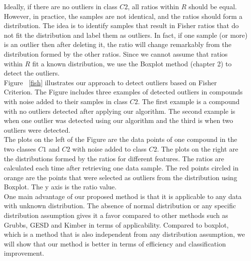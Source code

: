Ideally, if there are no outliers in class $C2$, all ratios within $R$ should be equal. However, in practice, the samples are not identical, and the ratios should form a distribution. The idea is to identify samples that result in Fisher ratios that do not fit the distribution and label them as outliers. In fact, if one sample (or more) is an outlier then after deleting it, the ratio will change remarkably from the distribution formed by the other ratios. Since we cannot assume that ratios within $R$ fit a known distribution, we use the Boxplot method (chapter 2) to detect the outliers.\\
Figure ~\ref{fish} illustrates our approach to detect outliers based on Fisher Criterion. The Figure includes three examples of detected outliers in compounds with noise added to their samples in class $C2$. The first example is a compound with no outliers detected after applying our algorithm. The second example is when one outlier was detected using our algorithm and the third is when two outliers were detected.\\
\indent The plots on the left of the Figure are the data points of one compound in the two classes $C1$ and $C2$ with noise added to class $C2$.
The plots on the right are the distributions formed by the ratios for different features. The ratios are calculated each time after retrieving one data sample. The red points circled in orange are the points that were selected as outliers from the distribution using Boxplot. The y axis is the ratio value.\\
\indent  One main advantage of our proposed method is that it is applicable to any data with unknown distribution. The absence of  normal distribution or any specific distribution assumption gives it a favor compared to other methods such as Grubbs, GESD and Kimber in terms of applicability. Compared to boxplot, which is a method that is also independent from any distribution assumption, we will show that our method is better in terms of efficiency and classification improvement.
